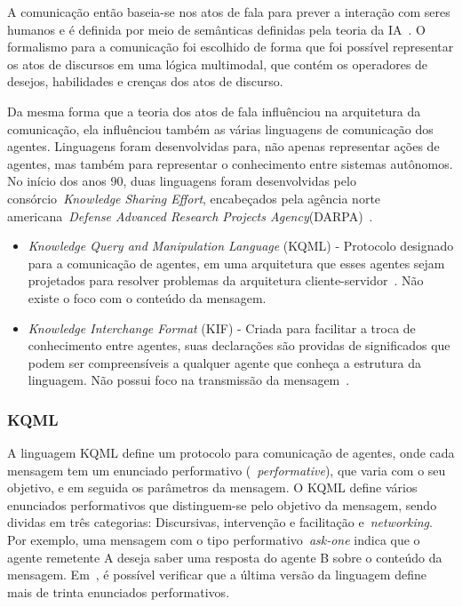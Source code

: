 A comunicação então baseia-se nos atos de fala para prever a interação com seres humanos e é definida por meio de semânticas definidas pela teoria da IA~\cite{wooldridge04}. O formalismo para a comunicação foi escolhido de forma que foi possível representar os atos de discursos em uma lógica multimodal, que contém os operadores de desejos, habilidades e crenças dos atos de discurso.

Da mesma forma que a teoria dos atos de fala influênciou na arquitetura da comunicação, ela influênciou também as várias linguagens de comunicação dos agentes. Linguagens foram desenvolvidas para, não apenas representar ações de agentes, mas também para representar o conhecimento entre sistemas autônomos. No início dos anos 90, duas linguagens foram desenvolvidas pelo consórcio~\emph{Knowledge Sharing Effort}, encabeçados pela agência norte americana~\emph{Defense Advanced Research Projects Agency}(DARPA)~\cite{kse}.
\begin{itemize}
	\item \emph{Knowledge Query and Manipulation Language} (KQML) - Protocolo designado para a comunicação de agentes, em uma arquitetura que esses agentes sejam projetados para resolver problemas da arquitetura cliente-servidor~\cite{preece1997}. Não existe o foco com o conteúdo da mensagem.
	\item \emph{Knowledge Interchange Format} (KIF) - Criada para facilitar a troca de conhecimento entre agentes, suas declarações são providas de significados que podem ser compreensíveis a qualquer agente que conheça a estrutura da linguagem. Não possui foco na transmissão da mensagem~\cite{kifmanual}.
\end{itemize}

\subsubsection{KQML}

A linguagem KQML define um protocolo para comunicação de agentes, onde cada mensagem tem um enunciado performativo (~\emph{performative}), que varia com o seu objetivo, e em seguida os parâmetros da mensagem. O KQML define vários enunciados performativos que distinguem-se pelo objetivo da mensagem, sendo dividas em três categorias: Discursivas, intervenção e facilitação e~\emph{networking}. Por exemplo, uma mensagem com o tipo performativo~\emph{ask-one} indica que o agente remetente A deseja saber uma resposta do agente B sobre o conteúdo da mensagem. Em~\cite{preece1997}, é possível verificar que a última versão da linguagem define mais de trinta enunciados performativos.

